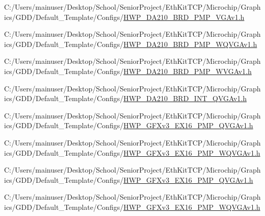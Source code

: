 \begin{DoxyCompactItemize}
C\+:/\+Users/mainuser/\+Desktop/\+School/\+Senior\+Project/\+Eth\+Kit\+T\+C\+P/\+Microchip/\+Graphics/\+G\+D\+D/\+Default\+\_\+\+Template/\+Configs/\hyperlink{_h_w_p___d_a210___b_r_d__16_p_m_p___v_g_av1_8h}{H\+W\+P\+\_\+\+D\+A210\+\_\+\+B\+R\+D\+\_\+P\+M\+P\+\_\+\+V\+G\+Av1.\+h}\item 
C\+:/\+Users/mainuser/\+Desktop/\+School/\+Senior\+Project/\+Eth\+Kit\+T\+C\+P/\+Microchip/\+Graphics/\+G\+D\+D/\+Default\+\_\+\+Template/\+Configs/\hyperlink{_h_w_p___d_a210___b_r_d__16_p_m_p___w_q_v_g_av1_8h}{H\+W\+P\+\_\+\+D\+A210\+\_\+\+B\+R\+D\+\_\+P\+M\+P\+\_\+\+W\+Q\+V\+G\+Av1.\+h}\item 
C\+:/\+Users/mainuser/\+Desktop/\+School/\+Senior\+Project/\+Eth\+Kit\+T\+C\+P/\+Microchip/\+Graphics/\+G\+D\+D/\+Default\+\_\+\+Template/\+Configs/\hyperlink{_h_w_p___d_a210___b_r_d__16_p_m_p___w_v_g_av1_8h}{H\+W\+P\+\_\+\+D\+A210\+\_\+\+B\+R\+D\+\_\+P\+M\+P\+\_\+\+W\+V\+G\+Av1.\+h}\item 
C\+:/\+Users/mainuser/\+Desktop/\+School/\+Senior\+Project/\+Eth\+Kit\+T\+C\+P/\+Microchip/\+Graphics/\+G\+D\+D/\+Default\+\_\+\+Template/\+Configs/\hyperlink{_h_w_p___d_a210___b_r_d___i_n_t___q_v_g_av1_8h}{H\+W\+P\+\_\+\+D\+A210\+\_\+\+B\+R\+D\+\_\+\+I\+N\+T\+\_\+\+Q\+V\+G\+Av1.\+h}\item 
C\+:/\+Users/mainuser/\+Desktop/\+School/\+Senior\+Project/\+Eth\+Kit\+T\+C\+P/\+Microchip/\+Graphics/\+G\+D\+D/\+Default\+\_\+\+Template/\+Configs/\hyperlink{_h_w_p___g_f_xv3___e_x16__16_p_m_p___q_v_g_av1_8h}{H\+W\+P\+\_\+\+G\+F\+Xv3\+\_\+\+E\+X16\+\_\+P\+M\+P\+\_\+\+Q\+V\+G\+Av1.\+h}\item 
C\+:/\+Users/mainuser/\+Desktop/\+School/\+Senior\+Project/\+Eth\+Kit\+T\+C\+P/\+Microchip/\+Graphics/\+G\+D\+D/\+Default\+\_\+\+Template/\+Configs/\hyperlink{_h_w_p___g_f_xv3___e_x16__16_p_m_p___w_q_v_g_av1_8h}{H\+W\+P\+\_\+\+G\+F\+Xv3\+\_\+\+E\+X16\+\_\+P\+M\+P\+\_\+\+W\+Q\+V\+G\+Av1.\+h}\item 
C\+:/\+Users/mainuser/\+Desktop/\+School/\+Senior\+Project/\+Eth\+Kit\+T\+C\+P/\+Microchip/\+Graphics/\+G\+D\+D/\+Default\+\_\+\+Template/\+Configs/\hyperlink{_h_w_p___g_f_xv3___e_x16__8_p_m_p___q_v_g_av1_8h}{H\+W\+P\+\_\+\+G\+F\+Xv3\+\_\+\+E\+X16\+\_\+P\+M\+P\+\_\+\+Q\+V\+G\+Av1.\+h}\item 
C\+:/\+Users/mainuser/\+Desktop/\+School/\+Senior\+Project/\+Eth\+Kit\+T\+C\+P/\+Microchip/\+Graphics/\+G\+D\+D/\+Default\+\_\+\+Template/\+Configs/\hyperlink{_h_w_p___g_f_xv3___e_x16__8_p_m_p___w_q_v_g_av1_8h}{H\+W\+P\+\_\+\+G\+F\+Xv3\+\_\+\+E\+X16\+\_\+P\+M\+P\+\_\+\+W\+Q\+V\+G\+Av1.\+h}\item 

\end{DoxyCompactItemize}
